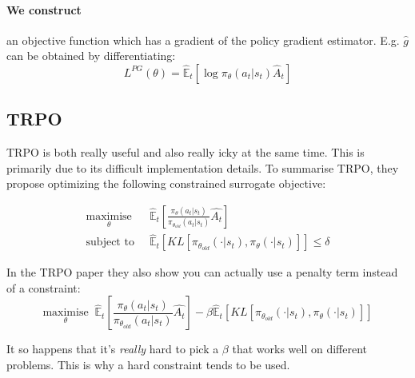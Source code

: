 \documentclass{article}
\begin{document}
\paragraph{We construct} an objective function which has a gradient of the policy gradient estimator. E.g. \(\hat{g}\) can be obtained by differentiating:
\[L^{PG} (\theta) = \hat{\mathbb{E}}_t \left [ \log\pi_\theta (a_t | s_t) \hat{A}_t \right] \]

\subsection{TRPO}

TRPO is both really useful and also really icky at the same time. This is primarily due to its difficult implementation details. To summarise TRPO, they propose optimizing the following constrained surrogate objective:

\begin{align*}
    \underset{\theta}{\text{maximise}} \;\; &\hat{\mathbb{E}}_{t} \left [ \frac{{\pi_\theta} (a_t|s_t)}{{\pi_{\theta_{old}}} (a_t|s_t)} \hat{A_t} \right] \\
    \text{subject to} \;\; &\hat{\mathbb{E}}_{t} \left [ KL \left[  \pi_{\theta_{old}} (\cdot|s_t), \pi_{\theta} (\cdot|s_t)\right] \right] \le \delta
\end{align*}

In the TRPO paper they also show you can actually use a penalty term instead of a constraint:
\[
    \underset{\theta}{\text{maximise}} \;\; \hat{\mathbb{E}}_{t} \left [ \frac{{\pi_\theta} (a_t|s_t)}{{\pi_{\theta_{old}}} (a_t|s_t)} \hat{A_t} \right] - \beta \hat{\mathbb{E}}_{t} \left [ KL \left[  \pi_{\theta_{old}} (\cdot|s_t), \pi_{\theta} (\cdot|s_t)\right] \right]
\]

It so happens that it's \emph{really} hard to pick a \(\beta\) that works well on different problems. This is why a hard constraint tends to be used. 
\end{document}

